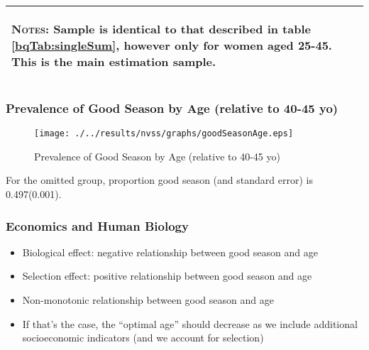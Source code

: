 \documentclass[10pt,letterpaper,subeqn]{beamer}
\begin{document}
\begin{frame}
\begin{table}[htpb!]
\begin{center}
{\begin{tabular}{lccccc}
\midrule\multicolumn{6}{p{12.8cm}}{\begin{footnotesize}\textsc{Notes:} Sample is identical to that described in table \ref{bqTab:singleSum}, however only for women aged 25-45.  This  is the main estimation sample.                                    \end{footnotesize}} \\ \bottomrule
 \end{tabular}}
\end{center}\end{table}
\end{frame}




\begin{frame}
\frametitle{Prevalence of Good Season by Age (relative to 40-45 yo)}
\begin{figure}[htpb!]
\caption{Prevalence of Good Season by Age (relative to 40-45 yo)}

  \centering
  \texttt{[image: ./../results/nvss/graphs/goodSeasonAge.eps]}
\end{figure}
{\tiny For the omitted group, proportion good season (and standard error) is 0.497(0.001).}
\end{frame}

\begin{frame}
\frametitle{Economics and Human Biology}
\begin{itemize}
\item Biological effect: negative relationship between good season and age
\item Selection effect: positive relationship between good season and age
\item Non-monotonic relationship between good season and age
\item If that's the case, the ``optimal age'' should decrease as we include additional socioeconomic indicators (and we account for selection)
\end{itemize}
\end{frame}
\end{document}
